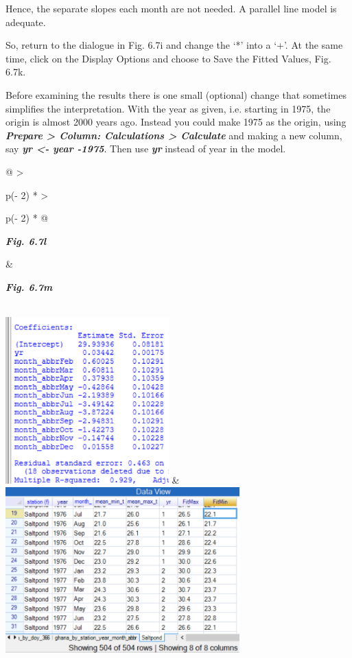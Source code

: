 \documentclass[
  letterpaper,
  DIV=11,
  numbers=noendperiod]{scrreprt}
\begin{document}
Hence, the separate slopes each month are not needed. A parallel line
model is adequate.

So, return to the dialogue in Fig. 6.7i and change the `*' into a `+'.
At the same time, click on the Display Options and choose to Save the
Fitted Values, Fig. 6.7k.

Before examining the results there is one small (optional) change that
sometimes simplifies the interpretation. With the year as given, i.e.
starting in 1975, the origin is almost 2000 years ago. Instead you could
make 1975 as the origin, using \textbf{\emph{Prepare \textgreater{}
Column: Calculations \textgreater{} Calculate}} and making a new column,
say \textbf{\emph{yr \textless- year -1975}}. Then use
\textbf{\emph{yr}} instead of year in the model.

\begin{longtable}[]{@{}
  >{\raggedright\arraybackslash}p{(\columnwidth - 2\tabcolsep) * }
  >{\raggedright\arraybackslash}p{(\columnwidth - 2\tabcolsep) * }@{}}
\toprule\noalign{}
\begin{minipage}[b]{\linewidth}\raggedright
\textbf{\emph{Fig. 6.7l}}
\end{minipage} & \begin{minipage}[b]{\linewidth}\raggedright
\textbf{\emph{Fig. 6.7m}}
\end{minipage} \\
\midrule\noalign{}
\endhead
\bottomrule\noalign{}
\endlastfoot
\includegraphics[width=2.47772in,height=2.53505in]{figures/Fig6.7l.png}
&
\includegraphics[width=3.55308in,height=2.50862in]{figures/Fig6.7m.png} \\
\end{longtable}
\end{document}
